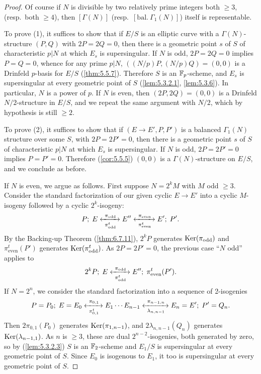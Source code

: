 \begin{proof}
Of course if $N$ is divisible by two relatively prime integers both $\ge 3$, (resp.\ both $\ge 4$), then $[\Gamma(N)]$ (resp.\ $[\mathrm{bal.}\ \Gamma_1(N)]$) itself is representable.

To prove (1), it suffices to show that if $E/S$ is an elliptic curve with a $\Gamma(N)$-structure $(P, Q)$ with $2P = 2Q = 0$, then there is a geometric point $s$ of $S$ of characteristic $p|N$ at which $E_s$ is supersingular. If $N$ is odd, $2P = 2Q = 0$ implies $P = Q = 0$, whence for any prime $p|N$, $((N/p)P, (N/p)Q) = (0,0)$ is a Drinfeld $p$-basis for $E/S$ (\ref{thm:5.5.7}). Therefore $S$ is an $\mathbb{F}_p$-scheme, and $E_s$ is supersingular at every geometric point of $S$ (\ref{lem:5.3.2.1}, \ref{lem:5.3.6}). In particular, $N$ is a power of $p$. If $N$ is even, then $(2P, 2Q) = (0,0)$ is a Drinfeld $N/2$-structure in $E/S$, and we repeat the same argument with $N/2$, which by hypothesis is still $\ge 2$.

To prove (2), it suffices to show that if $(E \to E', P, P')$ is a balanced $\Gamma_1(N)$ structure over some $S$, with $2P = 2P' = 0$, then there is a geometric point $s$ of $S$ of characteristic $p|N$ at which $E_s$ is supersingular. If $N$ is odd, $2P = 2P' = 0$ implies $P = P' = 0$. Therefore (\ref{cor:5.5.5}) $(0,0)$ is a $\Gamma(N)$-structure on $E/S$, and we conclude as before.

If $N$ is even, we argue as follows. First suppose $N = 2^k M$ with $M$ odd $\ge 3$. Consider the standard factorization of our given cyclic $E \to E'$ into a cyclic $M$-isogeny followed by a cyclic $2^k$-isogeny:
\[
P;\; E \xleftrightarrow[\ \pi^t_{\mathrm{odd}}\ ]{\ \pi_{\mathrm{odd}}\ } E'' \xleftrightarrow[\ \pi^t_{\mathrm{even}}\ ]{\ \pi_{\mathrm{even}}\ } E';\; P' .
\]
By the Backing-up Theorem (\ref{thm:6.7.11}), $2^k P$ generates $\operatorname{Ker}(\pi_{\mathrm{odd}})$ and $\pi^t_{\mathrm{even}}(P')$ generates $\operatorname{Ker}(\pi^t_{\mathrm{odd}})$. As $2P = 2P' = 0$, the previous case ``$N$ odd'' applies to
\[
2^k P;\; E \xleftrightarrow[\ \pi^t_{\mathrm{odd}}\ ]{\ \pi_{\mathrm{odd}}\ } E'';\; \pi^t_{\mathrm{even}}(P') .
\]
If $N = 2^n$, we consider the standard factorization into a sequence of 2-isogenies
\[
P = P_0;\; E = E_0 \xleftrightarrow[\ \pi^t_{0,1}\ ]{\ \pi_{0,1}\ } E_1 \cdots E_{n-1} \xleftrightarrow[\ \lambda_{n,n-1}\ ]{\ \pi_{n-1,n}\ } E_n = E';\; P' = Q_n .
\]
Then $2\pi_{0,1}(P_0)$ generates $\operatorname{Ker}(\pi_{1,n-1})$, and $2\lambda_{n,n-1}(Q_n)$ generates $\operatorname{Ker}(\lambda_{n-1,1})$. As $n$ is $\ge 3$, these are dual $2^{n-2}$-isogenies, both generated by zero, so by (\ref{lem:5.3.2.3}) $S$ is an $\mathbb{F}_2$-scheme and $E_1/S$ is supersingular at every geometric point of $S$. Since $E_0$ is isogenous to $E_1$, it too is supersingular at every geometric point of $S$.
\end{proof}

